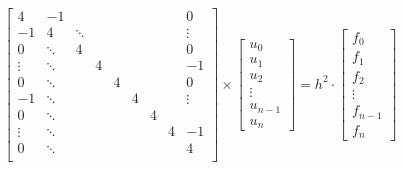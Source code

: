 
\begin{equation}
  \begin{bmatrix}
    4 & -1      & & & & & & & 0 \\
    -1 & 4 & \ddots &      & & & & & \vdots \\
    0 & \ddots      & 4 & & & & & & 0 \\
    \vdots & \ddots & & 4 & & & & & -1 \\
    0 & \ddots      & & & 4 & & & & 0 \\
    -1 & \ddots     & & & & 4 & & & \vdots \\
    0 & \ddots      & & & & & 4 & & \\
    \vdots & \ddots & & & & & & 4 & -1 \\
    0 & \ddots      & & & & & & & 4 \\
  \end{bmatrix}
  \times
  \begin{bmatrix}
    u_0 \\ u_1 \\ u_2 \\ \vdots \\ u_{n-1} \\ u_n
  \end{bmatrix}
  =
  h^2 \cdot
  \begin{bmatrix}
    f_0 \\ f_1 \\ f_2 \\ \vdots \\ f_{n-1} \\ f_n
  \end{bmatrix}
\end{equation}

